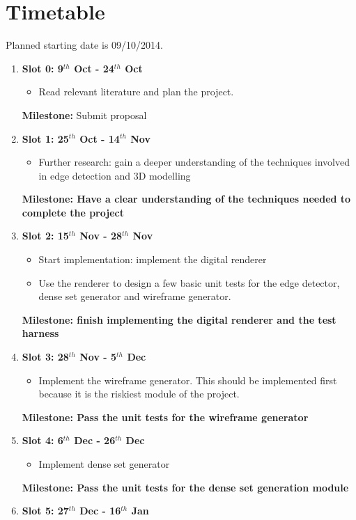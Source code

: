 \section*{Timetable}

Planned starting date is 09/10/2014.

\begin{enumerate}

\item {\bf Slot 0: 9$^{th}$ Oct - 24$^{th}$ Oct}
	\begin{itemize}
		\item Read relevant literature and plan the project.
	\end{itemize}
	{\bf Milestone:} Submit proposal
\item {\bf Slot 1: 25$^{th}$ Oct - 14$^{th}$ Nov}
	\begin{itemize}
		\item Further research: gain a deeper understanding of the techniques involved in edge detection and 3D modelling
	\end{itemize}
	{\bf Milestone: Have a clear understanding of the techniques needed to complete the project} 
\item {\bf Slot 2: 15$^{th}$ Nov  - 28$^{th}$ Nov}
	\begin{itemize}
		\item Start implementation: implement the digital renderer
		\item Use the renderer to design a few basic unit tests for the edge detector, dense set generator and wireframe generator.
	\end{itemize}
	{\bf Milestone: finish implementing the digital renderer and the test harness}
\item {\bf Slot 3: 28$^{th}$ Nov  - 5$^{th}$ Dec}
\begin{itemize}
		\item Implement the wireframe generator. This should be implemented first because it is the riskiest module of the project. 
	\end{itemize}
	{\bf Milestone: Pass the unit tests for the wireframe generator} 
\item {\bf Slot 4: 6$^{th}$ Dec -  26$^{th}$ Dec}
	\begin{itemize}
		\item Implement dense set generator
	\end{itemize}
	{\bf Milestone: Pass the unit tests for the dense set generation module} 
\item {\bf Slot 5: 27$^{th}$ Dec - 16$^{th}$ Jan}

\end{enumerate}
